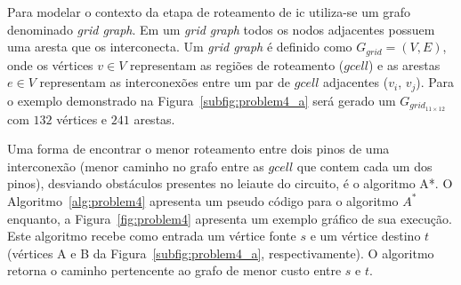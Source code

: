 Para modelar o contexto da etapa de roteamento de \ac{ic} utiliza-se um grafo denominado \textit{grid graph}.
Em um \textit{grid graph} todos os nodos adjacentes possuem uma aresta que os interconecta.
Um \textit{grid graph} é definido como $G_{grid} = (V,E)$, onde os vértices $v \in V$ representam as regiões de roteamento ($gcell$) e as arestas $e \in V$ representam as interconexões entre um par de $gcell$ adjacentes ($v_i$, $v_j$).
Para o exemplo demonstrado na Figura~\ref{subfig:problem4_a} será gerado um $G_{grid_{11\times12}}$ com $132$ vértices e $241$ arestas.

    



Uma forma de encontrar o menor roteamento entre dois pinos de uma interconexão (menor caminho no grafo entre as $gcell$ que contem cada um dos pinos), desviando obstáculos presentes no leiaute do circuito, é o algoritmo A*.
O Algoritmo~\ref{alg:problem4} apresenta um pseudo código para o algoritmo $A^*$ enquanto, a Figura~\ref{fig:problem4} apresenta um exemplo gráfico de sua execução.
Este algoritmo recebe como entrada um vértice fonte $s$ e um vértice destino $t$ (vértices A e B da Figura~\ref{subfig:problem4_a}, respectivamente).
O algoritmo retorna o caminho pertencente ao grafo de menor custo entre $s$ e $t$.

